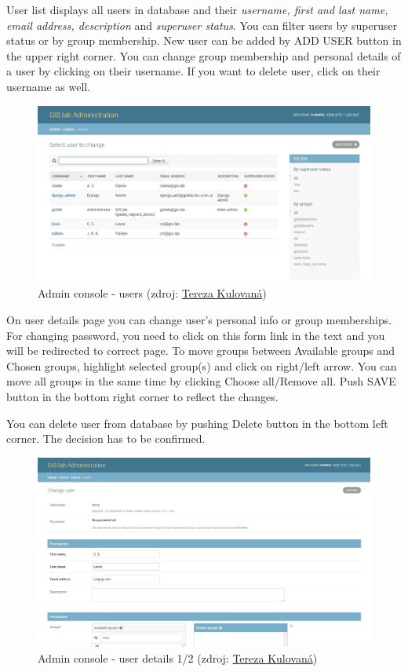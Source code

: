 User list displays all users in database and their \textit{username,
  first and last name, email address, description} and
\textit{superuser status}. You can filter users by superuser status or
by group membership. New user can be added by \textsf{ADD USER} button
in the upper right corner. You can change group membership and
personal details of a user by clicking on their username. If you want
to delete user, click on their username as well.
\begin{figure}[H] \centering
    \includegraphics[width=430pt]{./prilohy/guide-admin-users.png}
    \caption[Admin console - users]{Admin console - users (zdroj:
	\href{}{Tereza Kulovaná})}
	\label{fig:guide-admin-users}
\end{figure}

On user details page you can change user's personal info or group
memberships. For changing password, you need to click on \textsf{this
  form} link in the text and you will be redirected to correct
page. To move groups between \textsf{Available groups} and
\textsf{Chosen groups}, highlight selected group(s) and click on
right/left arrow. You can move all groups in the same time by clicking
\textsf{Choose all/Remove all}. Push \textsf{SAVE} button in the
bottom right corner to reflect the changes.

You can delete user from database by pushing \textsf{Delete} button in
the bottom left corner. The decision has to be confirmed.
\begin{figure}[H] \centering
    \includegraphics[width=430pt]{./prilohy/guide-admin-changeuser01.png}
    \caption[Admin console - user details 1/2]{Admin console - user details 1/2 (zdroj:
	\href{}{Tereza Kulovaná})}
	\label{fig:guide-admin-changeuser01}
\end{figure}

